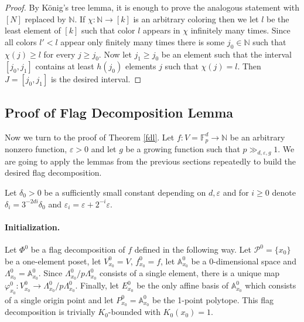 \documentclass{daj}
\renewcommand{\ge}{\geqslant}
\newcommand{\A}{\mathbb A}
\newcommand{\N}{\mathbb N}
\newcommand{\FF}{\mathbb F}
\renewcommand{\P}{\mathcal P}
\theoremstyle{definition}
\theoremstyle{remark}
\theoremstyle{definition}
\theoremstyle{definition}
\begin{document}
\begin{proof}
By K\"onig's tree lemma, it is enough to prove the analogous statement with $[N]$ replaced by $\N$. If $\chi: \N \rightarrow [k]$ is an arbitrary coloring then we let $l$ be the least element of $[k]$ such that color $l$ appears in $\chi$ infinitely many times. Since all colors $l' < l$ appear only finitely many times there is some $j_0 \in \N$ such that $\chi(j) \ge l$ for every $j \ge j_0$. Now let $j_1 \ge j_0$ be an element such that the interval $[j_0, j_1]$ contains at least $h(j_0)$ elements $j$ such that $\chi(j) = l$. Then $J = [j_0, j_1]$ is the desired interval.
\end{proof}

\subsection{Proof of Flag Decomposition Lemma}\label{s3}


Now we turn to the proof of Theorem \ref{fdl}. Let $f: V = \FF_p^d \rightarrow \N$ be an arbitrary nonzero function, $\varepsilon >0$ and let $g$ be a growing function such that $p \gg_{d, \varepsilon, g} 1$. We are going to apply the lemmas from the previous sections repeatedly to build the desired flag decomposition. 

Let $\delta_0 >0$ be a sufficiently small constant depending on $d, \varepsilon$ and for $i\ge 0$ denote $\delta_i = 3^{-2d i} \delta_0$ and $\varepsilon_i = \varepsilon + 2^{-i} \varepsilon$.

\paragraph{Initialization.} Let $\Phi^0$ be a flag decomposition of $f$ defined in the following way. Let $\P^0 = \{x_0\}$ be a one-element poset, let $V^0_{x_0} = V$, $f^0_{x_0} = f$, let $\A^0_{x_0}$ be a 0-dimensional space and $\Lambda^0_{x_0} = \A^0_{x_0}$. Since $\Lambda^0_{x_0} / p\Lambda^0_{x_0}$ consists of a single element, there is a unique map $\varphi^0_{x_0}: V^0_{x_0} \rightarrow \Lambda^0_{x_0} / p\Lambda^0_{x_0}$. Finally, let $E_{x_0}^0$ be the only affine basis of $\A^0_{x_0}$ which consists of a single origin point and let $P_{x_0}^0 = \A^0_{x_0}$ be the 1-point polytope. This flag decomposition is trivially $K_0$-bounded with $K_0(x_0) = 1$. 
\end{document}
